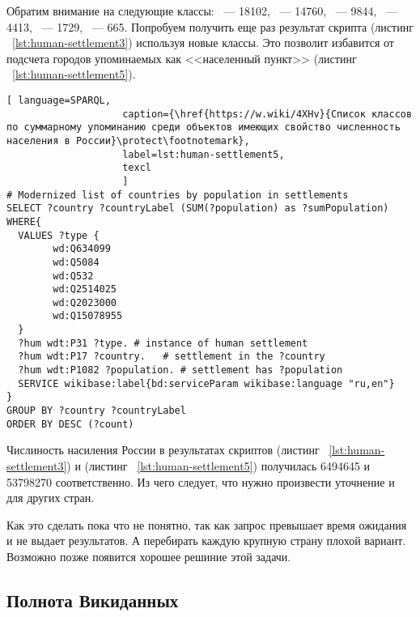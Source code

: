 Обратим внимание на следующие классы: ~--- \num{18102}, ~--- \num{14760}, ~--- \num{9844}, ~--- \num{4413}, ~--- \num{1729},  ~--- \num{665}. Попробуем получить еще раз результат скрипта (листинг ~\protect\ref{lst:human-settlement3}) используя новые классы. Это позволит избавится от подсчета городов упоминаемых как <<населенный пункт>> (листинг ~\protect\ref{lst:human-settlement5}).

\begin{lstlisting}[ language=SPARQL, 
                    caption={\href{https://w.wiki/4XHv}{Список классов по суммарному упоминанию среди объектов имеющих свойство численность населения в России}\protect\footnotemark},
                    label=lst:human-settlement5,
                    texcl 
                    ]
# Modernized list of countries by population in settlements
SELECT ?country ?countryLabel (SUM(?population) as ?sumPopulation) 
WHERE{
  VALUES ?type {
        wd:Q634099
        wd:Q5084
        wd:Q532
        wd:Q2514025
        wd:Q2023000
        wd:Q15078955
  }
  ?hum wdt:P31 ?type. # instance of human settlement
  ?hum wdt:P17 ?country.   # settlement in the ?country
  ?hum wdt:P1082 ?population. # settlement has ?population
  SERVICE wikibase:label{bd:serviceParam wikibase:language "ru,en"}
}
GROUP BY ?country ?countryLabel
ORDER BY DESC (?count)
\end{lstlisting}%

Числиность насиления России в результатах скриптов (листинг ~\protect\ref{lst:human-settlement3}) и (листинг ~\protect\ref{lst:human-settlement5}) получилась \num{6494645} и \num{53798270} соответственно. Из чего следует, что нужно произвести уточнение и для других стран.

 Как это сделать пока что не понятно, так как запрос превышает время ожидания и не выдает результатов. А перебирать каждую крупную страну плохой вариант. Возможно позже появится хорошее решиние этой задачи.

\subsection{Полнота Викиданных}

